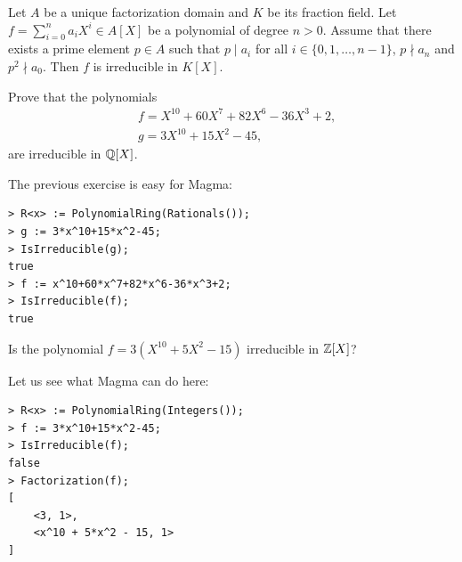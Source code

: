 \begin{bonus}
\label{bxca:Eisenstein's criterion}
    Let $A$ be a unique factorization domain and $K$ be its fraction field. 
    Let $f=\sum_{i=0}^n a_iX^i\in A[X]$ be a polynomial of degree $n>0$. 
    Assume that there exists a prime element $p\in A$ such that
    $p\mid a_i$ for all $i\in\{0,1,\dots,n-1\}$, $p\nmid a_n$ and
    $p^2\nmid a_0$. Then $f$ is irreducible in $K[X]$. 
\end{bonus}

\begin{exercise}
\label{xca: using Eisenstein}
    Prove that
    the polynomials 
    \begin{align*}
    &f=X^{10}+60X^7+82X^6-36X^3+2,\\
    &g=3X^{10}+15X^2-45, 
    \end{align*}
    are irreducible in $\mathbb{Q}[X]$. 
\end{exercise}

The previous exercise is easy for Magma:
\begin{lstlisting}
> R<x> := PolynomialRing(Rationals());
> g := 3*x^10+15*x^2-45;
> IsIrreducible(g);
true
> f := x^10+60*x^7+82*x^6-36*x^3+2;
> IsIrreducible(f);
true    
\end{lstlisting}

\begin{exercise}
\label{xca: counterexample of Eisenstein in Z}
    Is the polynomial $f=3(X^{10}+5X^2-15)$ irreducible in $\mathbb{Z}[X]$? 
\end{exercise}

Let us see what Magma can do here:
\begin{lstlisting}
> R<x> := PolynomialRing(Integers());
> f := 3*x^10+15*x^2-45;
> IsIrreducible(f);
false
> Factorization(f);
[
    <3, 1>,
    <x^10 + 5*x^2 - 15, 1>
]    
\end{lstlisting}


